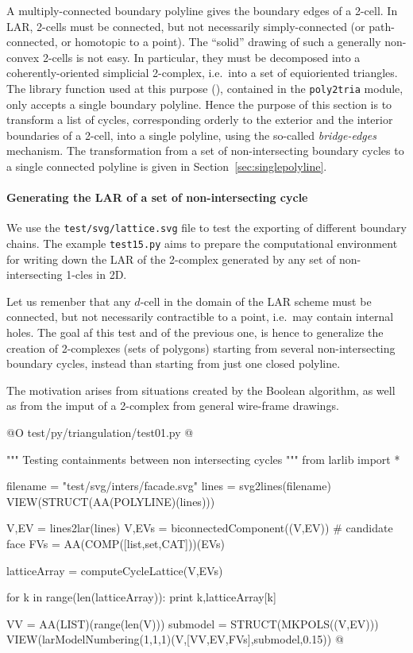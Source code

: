 \documentclass[11pt,oneside]{article}	%
\begin{document}
A multiply-connected boundary polyline gives the boundary edges of a 2-cell.
In LAR, 2-cells must be connected, but not necessarily simply-connected (or path-connected, or homotopic to a point). The ``solid'' drawing of such a generally non-convex 2-cells is not easy.
In particular, they must be decomposed into a coherently-oriented simplicial 2-complex, i.e.~into a set of equioriented triangles. The library function used at this purpose (), contained in the \texttt{poly2tria} module, only accepts a single boundary polyline. Hence the purpose of this section is to transform a list of cycles, corresponding orderly to the exterior and the interior boundaries of a 2-cell, into a single polyline, using the so-called \emph{bridge-edges}~\cite{Yamaguchi:85} mechanism. The transformation from a set of non-intersecting boundary cycles to a single connected polyline is given in Section~\ref{sec:singlepolyline}.


\paragraph{Generating the LAR of a set of non-intersecting cycle}

We use the \texttt{test/svg/lattice.svg} file to test the exporting of different boundary chains. The example \texttt{test15.py} aims to prepare the computational environment for writing down the LAR of the 2-complex generated by any set of non-intersecting 1-cles in 2D.

Let us remenber that any $d$-cell in the domain of the LAR scheme must be connected, but not necessarily contractible to a point, i.e.~may contain internal holes.
The goal af this test and of the previous one, is hence to generalize the creation of 2-complexes (sets of polygons) starting from several non-intersecting boundary cycles, instead than starting from just one closed polyline.

The motivation arises from situations created by the Boolean algorithm, as well as from the imput of a 2-complex from general wire-frame drawings.

@O test/py/triangulation/test01.py
@{""" Testing containments between non intersecting cycles """
from larlib import *

filename = "test/svg/inters/facade.svg"
lines = svg2lines(filename)
VIEW(STRUCT(AA(POLYLINE)(lines)))

V,EV = lines2lar(lines)
V,EVs = biconnectedComponent((V,EV))
# candidate face
FVs = AA(COMP([list,set,CAT]))(EVs)

latticeArray = computeCycleLattice(V,EVs)

for k in range(len(latticeArray)):
   print k,latticeArray[k]

VV = AA(LIST)(range(len(V)))
submodel = STRUCT(MKPOLS((V,EV)))
VIEW(larModelNumbering(1,1,1)(V,[VV,EV,FVs],submodel,0.15)) 
@}
\end{document}
